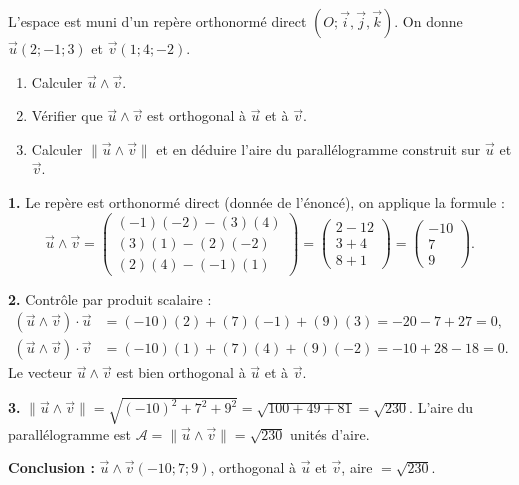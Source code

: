 \documentclass[11pt]{article}
\begin{document}
\begin{exoresolu}
L'espace est muni d'un repère orthonormé direct $(O;\vec{i},\vec{j},\vec{k})$. On donne $\vec{u}(2;-1;3)$ et $\vec{v}(1;4;-2)$.
\begin{enumerate}
\item Calculer $\vec{u}\wedge\vec{v}$.
\item Vérifier que $\vec{u}\wedge\vec{v}$ est orthogonal à $\vec{u}$ et à $\vec{v}$.
\item Calculer $\|\vec{u}\wedge\vec{v}\|$ et en déduire l'aire du parallélogramme construit sur $\vec{u}$ et $\vec{v}$.
\end{enumerate}
\tcblower
\textbf{1.} Le repère est orthonormé direct (donnée de l'énoncé), on applique la formule :
\[
\vec{u}\wedge\vec{v}
=
\begin{pmatrix}
(-1)(-2) - (3)(4) \\
(3)(1) - (2)(-2) \\
(2)(4) - (-1)(1)
\end{pmatrix}
=
\begin{pmatrix}
2 - 12 \\
3 + 4 \\
8 + 1
\end{pmatrix}
=
\begin{pmatrix}
-10 \\ 7 \\ 9
\end{pmatrix}.
\]

\textbf{2.} Contrôle par produit scalaire :
\begin{align*}
(\vec{u}\wedge\vec{v})\cdot\vec{u} &= (-10)(2) + (7)(-1) + (9)(3) = -20 - 7 + 27 = 0,\\
(\vec{u}\wedge\vec{v})\cdot\vec{v} &= (-10)(1) + (7)(4) + (9)(-2) = -10 + 28 - 18 = 0.
\end{align*}
Le vecteur $\vec{u}\wedge\vec{v}$ est bien orthogonal à $\vec{u}$ et à $\vec{v}$.

\textbf{3.} $\|\vec{u}\wedge\vec{v}\| = \sqrt{(-10)^2 + 7^2 + 9^2} = \sqrt{100 + 49 + 81} = \sqrt{230}$.
L'aire du parallélogramme est $\mathcal{A} = \|\vec{u}\wedge\vec{v}\| = \sqrt{230}$ unités d'aire.

\textbf{Conclusion :} $\vec{u}\wedge\vec{v}(-10;7;9)$, orthogonal à $\vec{u}$ et $\vec{v}$, aire $= \sqrt{230}$.
\end{exoresolu}
\end{document}
